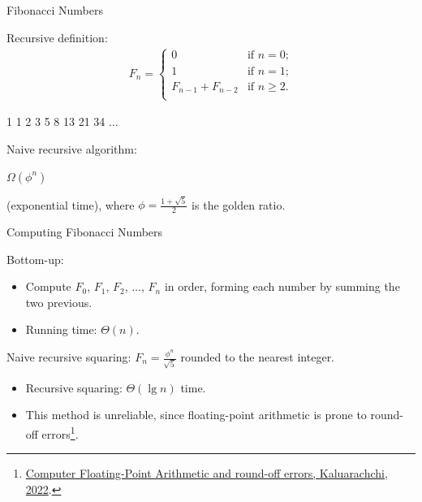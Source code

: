 \documentclass{beamer}
\begin{document}
\begin{frame}{Fibonacci Numbers}
    \begin{alertblock}{Recursive definition:}
        \begin{align*}
            F_n =
                \begin{cases}
                    0 & \text{if $n = 0$;} \\
                    1 & \text{if $n = 1$;} \\
                    F_{n - 1} + F_{n - 2} & \text{if $n \geq 2$.}\\
                \end{cases}
        \end{align*}
    \end{alertblock}
     \hspace{2mm} 1 \hspace{2mm} 1 \hspace{2mm} 2 \hspace{2mm} 3 \hspace{2mm} 5 \hspace{2mm} 8 \hspace{2mm} 13 \hspace{2mm} 21 \hspace{2mm} 34 \hspace{2mm} $\ldots$
    \begin{alertblock}{Naive recursive algorithm:}
        \begin{center}
            \LARGE
            $\Omega(\phi^n)$
        \end{center}
    \end{alertblock}
    (exponential time), where $\phi = \frac{1 + \sqrt{5}}{2}$ is the golden ratio.
\end{frame}

\begin{frame}{Computing Fibonacci Numbers}
    \begin{alertblock}{Bottom-up:}
        \begin{itemize}
            \item Compute $F_0$, $F_1$, $F_2$, $\ldots$, $F_n$ in order, forming each number by summing the two previous.
            \item Running time: $\Theta(n)$.
        \end{itemize}
    \end{alertblock}
    \pause
    \begin{alertblock}{Naive recursive squaring:}
        $F_n = \frac{\phi^n}{\sqrt{5}}$ rounded to the nearest integer. \pause
        \begin{itemize}
            \item Recursive squaring: $\Theta(\lg n)$ time. \pause
            \item This method is unreliable, since floating-point arithmetic is prone to round-off errors\footnote{\href{https://medium.com/@kusal95/computer-floating-point-arithmetic-and-round-off-errors-5c879c480982}{\tiny Computer Floating-Point Arithmetic and round-off errors, Kaluarachchi, 2022}.}.
        \end{itemize}
    \end{alertblock}
\end{frame}
\end{document}
